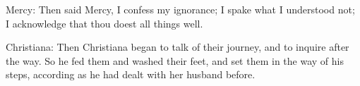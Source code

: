 Mercy: Then said Mercy, I confess my ignorance; I spake what I understood not; I acknowledge that thou doest all things well.

Christiana: Then Christiana began to talk of their journey, and to inquire after the way. So he fed them and washed their feet, and set them in the way of his steps, according as he had dealt with her husband before. 
